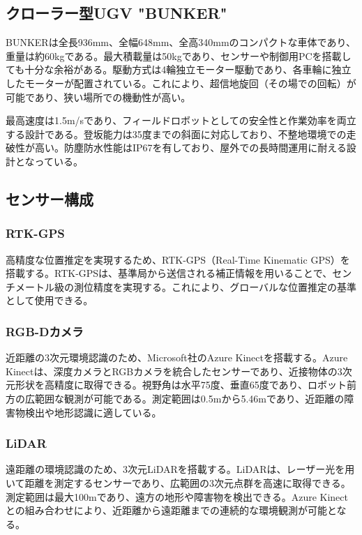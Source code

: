 \subsection{クローラー型UGV "BUNKER"}

BUNKERは全長936mm、全幅648mm、全高340mmのコンパクトな車体であり、重量は約60kgである。最大積載量は50kgであり、センサーや制御用PCを搭載しても十分な余裕がある。駆動方式は4輪独立モーター駆動であり、各車輪に独立したモーターが配置されている。これにより、超信地旋回（その場での回転）が可能であり、狭い場所での機動性が高い。

最高速度は1.5m/sであり、フィールドロボットとしての安全性と作業効率を両立する設計である。登坂能力は35度までの斜面に対応しており、不整地環境での走破性が高い。防塵防水性能はIP67を有しており、屋外での長時間運用に耐える設計となっている。

\subsection{センサー構成}

\subsubsection{RTK-GPS}

高精度な位置推定を実現するため、RTK-GPS（Real-Time Kinematic GPS）を搭載する。RTK-GPSは、基準局から送信される補正情報を用いることで、センチメートル級の測位精度を実現する。これにより、グローバルな位置推定の基準として使用できる。

\subsubsection{RGB-Dカメラ}

近距離の3次元環境認識のため、Microsoft社のAzure Kinectを搭載する。Azure Kinectは、深度カメラとRGBカメラを統合したセンサーであり、近接物体の3次元形状を高精度に取得できる。視野角は水平75度、垂直65度であり、ロボット前方の広範囲な観測が可能である。測定範囲は0.5mから5.46mであり、近距離の障害物検出や地形認識に適している。

\subsubsection{LiDAR}

遠距離の環境認識のため、3次元LiDARを搭載する。LiDARは、レーザー光を用いて距離を測定するセンサーであり、広範囲の3次元点群を高速に取得できる。測定範囲は最大100mであり、遠方の地形や障害物を検出できる。Azure Kinectとの組み合わせにより、近距離から遠距離までの連続的な環境観測が可能となる。

